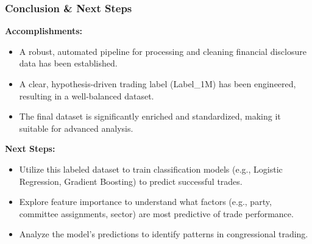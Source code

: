 \documentclass[aspectratio=169]{beamer}
\begin{document}
\begin{frame}
    \frametitle{Conclusion & Next Steps}
    \textbf{Accomplishments:}
    \begin{itemize}
        \item A robust, automated pipeline for processing and cleaning financial disclosure data has been established.
        \item A clear, hypothesis-driven trading label (Label_1M) has been engineered, resulting in a well-balanced dataset.
        \item The final dataset is significantly enriched and standardized, making it suitable for advanced analysis.
    \end{itemize}
    \vspace{1em}
    \textbf{Next Steps:}
    \begin{itemize}
        \item Utilize this labeled dataset to train classification models (e.g., Logistic Regression, Gradient Boosting) to predict successful trades.
        \item Explore feature importance to understand what factors (e.g., party, committee assignments, sector) are most predictive of trade performance.
        \item Analyze the model's predictions to identify patterns in congressional trading.
    \end{itemize}
\end{frame}
\end{document}

